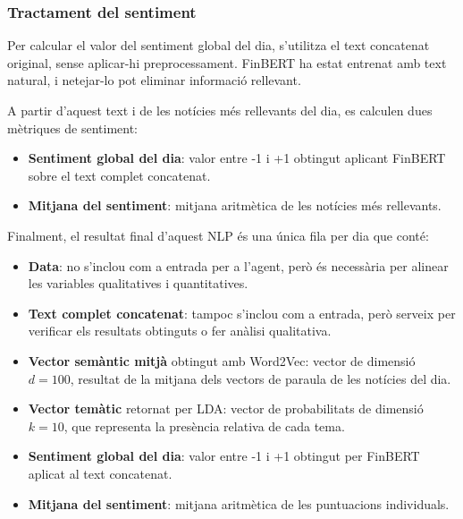 \documentclass[12pt,a4paper,twoside]{book}
\begin{document}
\subsubsection{Tractament del sentiment}

Per calcular el valor del sentiment global del dia, s'utilitza el text concatenat original, sense aplicar-hi preprocessament. FinBERT ha estat entrenat amb text natural, i netejar-lo pot eliminar informació rellevant.

A partir d'aquest text i de les notícies més rellevants del dia, es calculen dues mètriques de sentiment:

\begin{itemize}
    \item \textbf{Sentiment global del dia}: valor entre -1 i +1 obtingut aplicant FinBERT sobre el text complet concatenat.
    \item \textbf{Mitjana del sentiment}: mitjana aritmètica de les notícies més rellevants.
\end{itemize}

Finalment, el resultat final d'aquest NLP és una única fila per dia que conté:

\begin{itemize}
    \item \textbf{Data}: no s'inclou com a entrada per a l'agent, però és necessària per alinear les variables qualitatives i quantitatives.

    \item \textbf{Text complet concatenat}: tampoc s'inclou com a entrada, però serveix per verificar els resultats obtinguts o fer anàlisi qualitativa.

    \item \textbf{Vector semàntic mitjà} obtingut amb Word2Vec: vector de dimensió $d=100$, resultat de la mitjana dels vectors de paraula de les notícies del dia.

    \item \textbf{Vector temàtic} retornat per LDA: vector de probabilitats de dimensió $k=10$, que representa la presència relativa de cada tema.

    \item \textbf{Sentiment global del dia}: valor entre -1 i +1 obtingut per FinBERT aplicat al text concatenat.

    \item \textbf{Mitjana del sentiment}: mitjana aritmètica de les puntuacions individuals.

\end{itemize}
\end{document}
